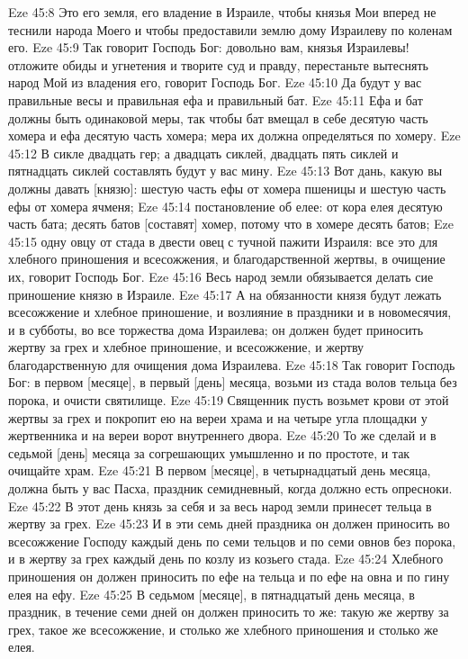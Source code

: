 Eze 45:8  Это его земля, его владение в Израиле, чтобы князья Мои вперед не теснили народа Моего и чтобы предоставили землю дому Израилеву по коленам его.
Eze 45:9  Так говорит Господь Бог: довольно вам, князья Израилевы! отложите обиды и угнетения и творите суд и правду, перестаньте вытеснять народ Мой из владения его, говорит Господь Бог.
Eze 45:10  Да будут у вас правильные весы и правильная ефа и правильный бат.
Eze 45:11  Ефа и бат должны быть одинаковой меры, так чтобы бат вмещал в себе десятую часть хомера и ефа десятую часть хомера; мера их должна определяться по хомеру.
Eze 45:12  В сикле двадцать гер; а двадцать сиклей, двадцать пять сиклей и пятнадцать сиклей составлять будут у вас мину.
Eze 45:13  Вот дань, какую вы должны давать [князю]: шестую часть ефы от хомера пшеницы и шестую часть ефы от хомера ячменя;
Eze 45:14  постановление об елее: от кора елея десятую часть бата; десять батов [составят] хомер, потому что в хомере десять батов;
Eze 45:15  одну овцу от стада в двести овец с тучной пажити Израиля: все это для хлебного приношения и всесожжения, и благодарственной жертвы, в очищение их, говорит Господь Бог.
Eze 45:16  Весь народ земли обязывается делать сие приношение князю в Израиле.
Eze 45:17  А на обязанности князя будут лежать всесожжение и хлебное приношение, и возлияние в праздники и в новомесячия, и в субботы, во все торжества дома Израилева; он должен будет приносить жертву за грех и хлебное приношение, и всесожжение, и жертву благодарственную для очищения дома Израилева.
Eze 45:18  Так говорит Господь Бог: в первом [месяце], в первый [день] месяца, возьми из стада волов тельца без порока, и очисти святилище.
Eze 45:19  Священник пусть возьмет крови от этой жертвы за грех и покропит ею на вереи храма и на четыре угла площадки у жертвенника и на вереи ворот внутреннего двора.
Eze 45:20  То же сделай и в седьмой [день] месяца за согрешающих умышленно и по простоте, и так очищайте храм.
Eze 45:21  В первом [месяце], в четырнадцатый день месяца, должна быть у вас Пасха, праздник семидневный, когда должно есть опресноки.
Eze 45:22  В этот день князь за себя и за весь народ земли принесет тельца в жертву за грех.
Eze 45:23  И в эти семь дней праздника он должен приносить во всесожжение Господу каждый день по семи тельцов и по семи овнов без порока, и в жертву за грех каждый день по козлу из козьего стада.
Eze 45:24  Хлебного приношения он должен приносить по ефе на тельца и по ефе на овна и по гину елея на ефу.
Eze 45:25  В седьмом [месяце], в пятнадцатый день месяца, в праздник, в течение семи дней он должен приносить то же: такую же жертву за грех, такое же всесожжение, и столько же хлебного приношения и столько же елея.
